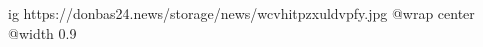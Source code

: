  
 
 
 
 

\ifcmt
  ig https://donbas24.news/storage/news/wcvhitpzxuldvpfy.jpg
  @wrap center
  @width 0.9
\fi
